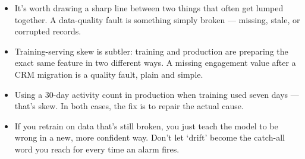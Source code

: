 \documentclass[11pt,a4paper]{article}
\begin{document}
\begin{examplebox}[title after break={SPOKEN SCRIPT --- slide 23 continued}]
\begin{itemize}
\item It's worth drawing a sharp line between two things that often get lumped together. A data-quality fault is something simply broken — missing, stale, or corrupted records.
\item Training-serving skew is subtler: training and production are preparing the exact same feature in two different ways. A missing engagement value after a CRM migration is a quality fault, plain and simple.
\item Using a 30-day activity count in production when training used seven days — that's skew. In both cases, the fix is to repair the actual cause.
\item If you retrain on data that's still broken, you just teach the model to be wrong in a new, more confident way. Don't let ‘drift’ become the catch-all word you reach for every time an alarm fires.
\end{itemize}
\end{examplebox}
\par\noindent{\scriptsize\textcolor{teal!60!black}{Reading anchor: Bass, Ch. 11 / §14.1.5}}
\clearpage
\end{document}
